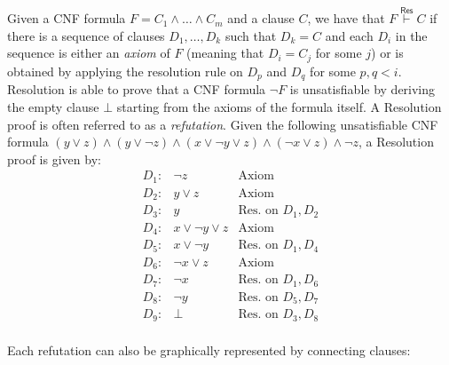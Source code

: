 Given a CNF formula $F = C_1 \land \ldots \land C_m$ and a clause $C$, we have that $F \stackrel{\mathsf{Res}}{\vdash} C$ if there is a sequence of clauses $D_1, \ldots, D_k$ such that $D_k = C$ and each $D_i$ in the sequence is either an \textit{axiom} of $F$ (meaning that $D_i = C_j$ for some $j$) or is obtained by applying the resolution rule on $D_p$ and $D_q$ for some $p,q < i$. Resolution is able to prove that a CNF formula $\lnot F$ is unsatisfiable by deriving the empty clause $\bot$ starting from the axioms of the formula itself. A Resolution proof is often referred to as a \textit{refutation}. Given the following unsatisfiable CNF formula $(y \lor z) \land (y \lor \lnot{z}) \land (x \lor \lnot{y} \lor z) \land (\lnot{x} \lor z) \land \lnot{z}$, a Resolution proof is given by:
\[\begin{array}{lcl}
 D_1 :& \lnot{z} & \text{Axiom} \\
 D_2 :& y \lor z & \text{Axiom} \\
 D_3 :& y & \text{Res. on $D_1, D_2$} \\
 D_4 :& x \lor \lnot{y} \lor z  & \text{Axiom} \\
 D_5 :& x \lor \lnot{y} & \text{Res. on $D_1, D_4$} \\
 D_6 :& \lnot{x} \lor z & \text{Axiom} \\
 D_7 :& \lnot{x} & \text{Res. on $D_1, D_6$} \\
 D_8 :& \lnot{y} & \text{Res. on $D_5, D_7$} \\
 D_9 :& \bot & \text{Res. on $D_3, D_8$} \\
\end{array}\]

Each refutation can also be graphically represented by connecting clauses:

